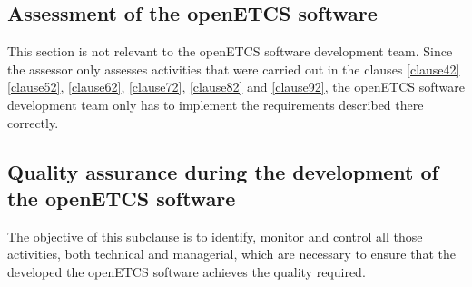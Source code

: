 \documentclass{template/openetcs_report}
\begin{document}
\subsection{Assessment of the openETCS software}
This section is not relevant to the openETCS software development team. Since the assessor only assesses activities that were carried out in the clauses \ref{clause42} \ref{clause52}, \ref{clause62}, \ref{clause72},  \ref{clause82} and \ref{clause92}, the openETCS software development team only has to implement the requirements described there correctly.


\subsection{Quality assurance during the development of the openETCS software}
\begin{flushleft}
The objective of this subclause is to identify, monitor and control all those activities, both technical and managerial, which are necessary to ensure that the developed the openETCS software achieves the quality required. 
\end{flushleft}
\end{document}

